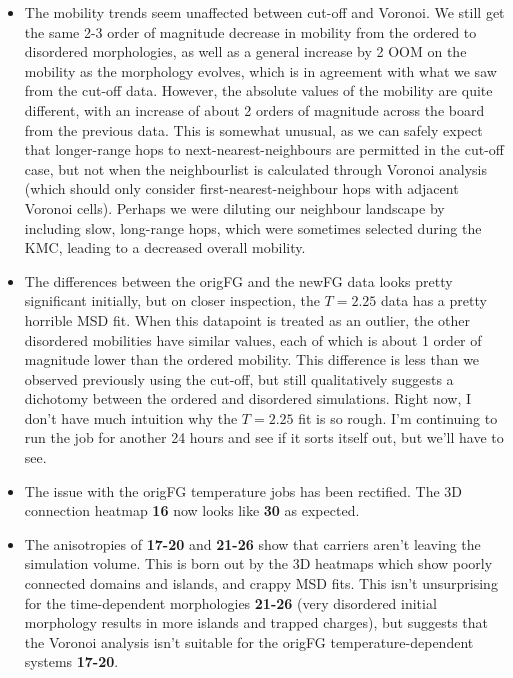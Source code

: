 \documentclass[12pt]{article}
\begin{document}
\begin{itemize}
    \item{The mobility trends seem unaffected between cut-off and Voronoi.
            We still get the same 2-3 order of magnitude decrease in mobility from the ordered to disordered morphologies, as well as a general increase by 2 OOM on the mobility as the morphology evolves, which is in agreement with what we saw from the cut-off data.
            However, the absolute values of the mobility are quite different, with an increase of about 2 orders of magnitude across the board from the previous data.
            This is somewhat unusual, as we can safely expect that longer-range hops to next-nearest-neighbours are permitted in the cut-off case, but not when the neighbourlist is calculated through Voronoi analysis (which should only consider first-nearest-neighbour hops with adjacent Voronoi cells).
            Perhaps we were diluting our neighbour landscape by including slow, long-range hops, which were sometimes selected during the KMC, leading to a decreased overall mobility.
        }
    \item{The differences between the origFG and the newFG data looks pretty significant initially, but on closer inspection, the $T = 2.25$ data has a pretty horrible MSD fit.
            When this datapoint is treated as an outlier, the other disordered mobilities have similar values, each of which is about 1 order of magnitude lower than the ordered mobility.
            This difference is less than we observed previously using the cut-off, but still qualitatively suggests a dichotomy between the ordered and disordered simulations.
        Right now, I don't have much intuition why the $T = 2.25$ fit is so rough.
    I'm continuing to run the job for another 24 hours and see if it sorts itself out, but we'll have to see.}
    \item{The issue with the origFG temperature jobs has been rectified.
        The 3D connection heatmap \textbf{16} now looks like \textbf{30} as expected.}
\item{The anisotropies of \textbf{17-20} and \textbf{21-26} show that carriers aren't leaving the simulation volume.
    This is born out by the 3D heatmaps which show poorly connected domains and islands, and crappy MSD fits.
    This isn't unsurprising for the time-dependent morphologies \textbf{21-26} (very disordered initial morphology results in more islands and trapped charges), but suggests that the Voronoi analysis isn't suitable for the origFG temperature-dependent systems \textbf{17-20}.
}
\end{itemize}
\end{document}
